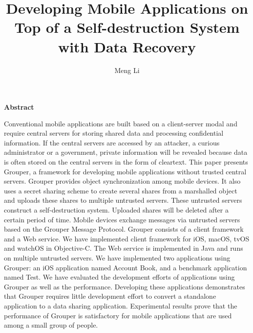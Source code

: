 \documentclass[a4paper,11pt]{report}
\title{Developing Mobile Applications on Top of a Self-destruction System with Data Recovery}
\author{Meng Li}
\begin{document}
		
\maketitle
\thispagestyle{empty}
\newpage

\thispagestyle{empty}
\vspace*{20pt plus 1fil}
\noindent
\begin{center}
{\bf Abstract}
\vspace{5mm}
\end{center}
Conventional mobile applications are built based on a client-server modal and require central servers for storing shared data and processing confidential information.
If the central servers are accessed by an attacker, a curious administrator or a government, private information will be revealed because data is often stored on the central servers in the form of cleartext.
This paper presents Grouper, a framework for developing mobile applications without trusted central servers.
Grouper provides object synchronization among mobile devices.
It also uses a secret sharing scheme to create several shares from a marshalled object and uploads these shares to multiple untrusted servers. 
These untrusted servers construct a self-destruction system.
Uploaded shares will be deleted after a certain period of time.
Mobile devices exchange messages via untrusted servers based on the Grouper Message Protocol.
Grouper consists of a client framework and a Web service.
We have implemented client framework for iOS, macOS, tvOS and watchOS in Objective-C.
The Web service is implemented in Java and runs on multiple untrusted servers.
We have implemented two applications using Grouper: an iOS application named Account Book, and a benchmark application named Test.
We have evaluated the development efforts of applications using Grouper as well as the performance. 
Developing these applications demonstrates that Grouper requires little development effort to convert a standalone application to a data sharing application.
Experimental results prove that the performance of Grouper is satisfactory for mobile applications that are used among a small group of people.


\par
\vspace{0pt plus 1fil}
\newpage

\tableofcontents
\listoffigures

\pagebreak \setcounter{page}{1}
\end{document}

